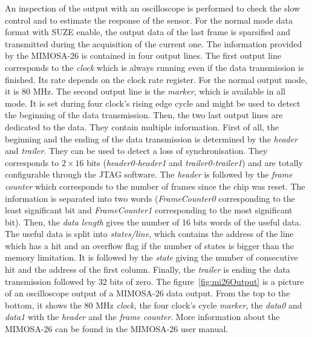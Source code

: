   An inspection of the output with an oscilloscope is performed to check the slow control and to estimate the response of the sensor.
  For the normal mode data format with SUZE enable, the output data of the last frame is sparsified and transmitted during the acquisition of the current one.
  The information provided by the MIMOSA-26 is contained in four output lines.
  The first output line corresponds to the \textit{clock} which is always running even if the data transmission is finished. 
  Its rate depends on the clock rate register. 
  For the normal output mode, it is 80 MHz.
  The second output line is the \textit{marker}, which is available in all mode.
  It is set during four clock's rising edge cycle and might be used to detect the beginning of the data transmission.
  Then, the two last output lines are dedicated to the data.
  They contain multiple information.
  First of all, the beginning and the ending of the data transmission is determined by the \textit{header} and \textit{trailer}.
  They can be used to detect a loss of synchronisation.
  They corresponds to $2 \times 16$ bits (\textit{header0-header1} and \textit{trailer0-trailer1}) and are totally configurable through the JTAG software.
  The \textit{header} is followed by the \textit{frame counter} which corresponds to the number of frames since the chip was reset. 
  The information is separated into two words (\textit{FrameCounter0} corresponding to the least significant bit and \textit{FrameCounter1} corresponding to the most significant bit).
  Then, the \textit{data length} gives the number of 16 bits words of the useful data. 
  The useful data is split into \textit{states/line}, which contains the address of the line which has a hit and an overflow flag if the number of states is bigger than the memory limitation.
  It is followed by the \textit{state} giving the number of consecutive hit and the address of the first column.
  Finally, the \textit{trailer} is ending the data transmission followed by 32 bits of zero.
  The figure~\ref{fig:mi26Output} is a picture of an oscilloscope output of a MIMOSA-26 data output. From the top to the bottom, it shows the 80 MHz \textit{clock}, the four clock's cycle \textit{marker}, the \textit{data0} and \textit{data1} with the \textit{header} and the \textit{frame counter}.
  More information about the MIMOSA-26 can be found in the MIMOSA-26 user manual\cite{manualMi26}.

